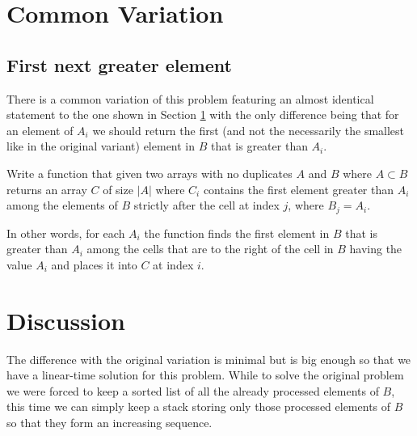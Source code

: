 

\section{Common Variation}
\subsection{First next greater element}
\label{next_greater_element:sec:first}
There is a common variation of this problem featuring an almost identical statement to the one shown
in Section \ref{} with the only difference being that for an element of $A_i$ we should return the
first (and not the necessarily the smallest like in the original variant) element in $B$ that is
greater than $A_i$.

\begin{exercise}
	\label{example:next_greater_element:exercice2}
	Write a function that given two arrays with no duplicates $A$ and $B$ where $A \subset B$
	returns an array $C$ of size $|A|$ where $C_i$ contains the first element greater than $A_i$
	among the elements of $B$ strictly after the cell at index $j$, where $B_j = A_i$.
	
	In other words, for each $A_i$ the function finds the first element in $B$ that is greater than
	$A_i$ among the cells that are to the right of the cell in $B$ having the value $A_i$ and places
	it into $C$ at index $i$.

\end{exercise}

\section{Discussion}
\label{next_greater_element:sec:variation1:discussion}
The difference with the original variation is minimal but is big enough so that we have a
linear-time solution for this problem. While to solve the original problem  we were forced to keep a
sorted list of all the already processed elements of $B$, this time we can simply keep a stack
storing only those processed elements of $B$ so that they form an increasing sequence.

